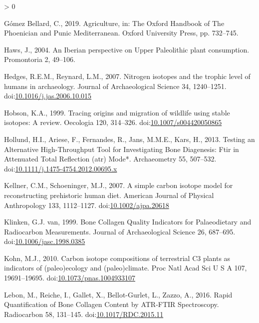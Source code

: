 \documentclass[5p]{elsarticle} %
\newlength{\cslhangindent}
\newenvironment{CSLReferences}[2] %
 {%
  \setlength{\parindent}{0pt}
  \ifodd #1 \everypar{\setlength{\hangindent}{\cslhangindent}}\ignorespaces\fi
  \ifnum #2 > 0
  \setlength{\parskip}{#2\baselineskip}
  \fi
 }%
 {}
\begin{document}
\begin{CSLReferences}{1}{0}
\leavevmode\hypertarget{ref-gomezbellard19}{}%
Gómez Bellard, C., 2019. Agriculture, in: The {Oxford Handbook} of {The Phoenician} and {Punic Mediterranean}. {Oxford University Press}, pp. 732--745.

\leavevmode\hypertarget{ref-haws04}{}%
Haws, J., 2004. An {Iberian} perspective on {Upper Paleolithic} plant consumption. Promontoria 2, 49--106.

\leavevmode\hypertarget{ref-hedges_reynard07}{}%
Hedges, R.E.M., Reynard, L.M., 2007. Nitrogen isotopes and the trophic level of humans in archaeology. Journal of Archaeological Science 34, 1240--1251. doi:\href{https://doi.org/10.1016/j.jas.2006.10.015}{10.1016/j.jas.2006.10.015}

\leavevmode\hypertarget{ref-hobson99}{}%
Hobson, K.A., 1999. Tracing origins and migration of wildlife using stable isotopes: A review. Oecologia 120, 314--326. doi:\href{https://doi.org/10.1007/s004420050865}{10.1007/s004420050865}

\leavevmode\hypertarget{ref-hollund_etal13}{}%
Hollund, H.I., Ariese, F., Fernandes, R., Jans, M.M.E., Kars, H., 2013. Testing an {Alternative High}-{Throughput Tool} for {Investigating Bone Diagenesis}: {Ftir} in {Attenuated Total Reflection} (atr) {Mode}*. Archaeometry 55, 507--532. doi:\href{https://doi.org/10.1111/j.1475-4754.2012.00695.x}{10.1111/j.1475-4754.2012.00695.x}

\leavevmode\hypertarget{ref-kellner_schoeninger07}{}%
Kellner, C.M., Schoeninger, M.J., 2007. A simple carbon isotope model for reconstructing prehistoric human diet. American Journal of Physical Anthropology 133, 1112--1127. doi:\href{https://doi.org/10.1002/ajpa.20618}{10.1002/ajpa.20618}

\leavevmode\hypertarget{ref-vanklinken99}{}%
Klinken, G.J. van, 1999. Bone {Collagen Quality Indicators} for {Palaeodietary} and {Radiocarbon Measurements}. Journal of Archaeological Science 26, 687--695. doi:\href{https://doi.org/10.1006/jasc.1998.0385}{10.1006/jasc.1998.0385}

\leavevmode\hypertarget{ref-kohn10}{}%
Kohn, M.J., 2010. Carbon isotope compositions of terrestrial {C3} plants as indicators of (paleo)ecology and (paleo)climate. Proc Natl Acad Sci U S A 107, 19691--19695. doi:\href{https://doi.org/10.1073/pnas.1004933107}{10.1073/pnas.1004933107}

\leavevmode\hypertarget{ref-lebon_etal16}{}%
Lebon, M., Reiche, I., Gallet, X., Bellot-Gurlet, L., Zazzo, A., 2016. Rapid {Quantification} of {Bone Collagen Content} by {ATR}-{FTIR Spectroscopy}. Radiocarbon 58, 131--145. doi:\href{https://doi.org/10.1017/RDC.2015.11}{10.1017/RDC.2015.11}


\end{CSLReferences}
\end{document}
